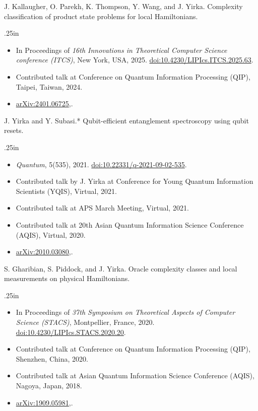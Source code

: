 \documentclass[11pt,letterpaper,serif]{moderncv}
\begin{document}
J. Kallaugher, O. Parekh, K. Thompson, Y. Wang, and J. Yirka.\quad
Complexity classification of product state problems for local Hamiltonians.
\begin{adjustwidth}{.25in}{}
	\begin{itemize}
		\item[\textbullet] In Proceedings of \textit{16th Innovations in Theoretical Computer Science conference (ITCS)}, New York, USA, 2025.\quad
		\href{https://doi.org/10.4230/LIPIcs.ITCS.2025.63}{doi:10.4230/LIPIcs.ITCS.2025.63}.
		\item[\textbullet] Contributed talk at Conference on Quantum Information Processing (QIP), Taipei, Taiwan, 2024.
		\item[--] \href{https://arxiv.org/abs/2401.06725}{arXiv:2401.06725},.
	\end{itemize}
\end{adjustwidth}
\medskip

J. Yirka and Y. Subasi.*\quad
Qubit-efficient entanglement spectroscopy using qubit resets.
\begin{adjustwidth}{.25in}{}
	\begin{itemize}
		\item[--] \textit{Quantum}, 5(535), 2021.\quad
		\href{https://doi.org/10.22331/q-2021-09-02-535}{doi:10.22331/q-2021-09-02-535}.
		\item[\textbullet] Contributed talk by J. Yirka at Conference for Young Quantum Information Scientists (YQIS), Virtual, 2021.
		\item Contributed talk at APS March Meeting, Virtual, 2021.
		\item[\textbullet] Contributed talk at 20th Asian Quantum Information Science Conference (AQIS), Virtual, 2020.
		\item[--] \href{https://arxiv.org/abs/2010.03080}{arXiv:2010.03080},.
	\end{itemize}
\end{adjustwidth}
\medskip

S. Gharibian, S. Piddock, and J. Yirka.\quad
Oracle complexity classes and local measurements on physical Hamiltonians.
\begin{adjustwidth}{.25in}{}
	\begin{itemize}
		\item In Proceedings of \textit{37th Symposium on Theoretical Aspects of Computer Science (STACS)}, Montpellier, France, 2020.\quad
		\href{https://doi.org/10.4230/LIPIcs.STACS.2020.20}{doi:10.4230/LIPIcs.STACS.2020.20}.
		\item[\textbullet] Contributed talk at Conference on Quantum Information Processing (QIP), Shenzhen, China, 2020.
		\item[\textbullet] Contributed talk at Asian Quantum Information Science Conference (AQIS), Nagoya, Japan, 2018.
		\item[--]  \href{https://arxiv.org/abs/1909.05981}{arXiv:1909.05981},.
	\end{itemize}
\end{adjustwidth}
\medskip
\end{document}
